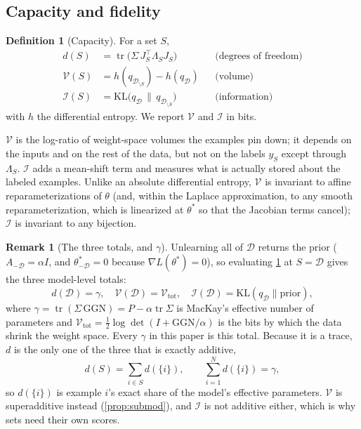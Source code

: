 \documentclass[10pt,twocolumn,letterpaper]{article}
\theoremstyle{definition}
\newtheorem{definition}{Definition}
\newtheorem{remark}{Remark}   %
\newcommand{\KL}{\mathrm{KL}}
\newcommand{\tr}{\operatorname{tr}}
\newcommand{\logdet}{\log\det}
\newcommand{\Vol}{\mathcal{V}}
\newcommand{\Inf}{\mathcal{I}}
\newcommand{\D}{\mathcal{D}}
\newcommand{\DS}{\mathcal{D}_{\setminus S}}
\newcommand{\T}{^{\top}}
\newcommand{\dof}{d}
\begin{document}
\subsection{Capacity and fidelity}
\begin{definition}[Capacity]\label{def:capacity}
For a set $S$,
\begin{align*}
\dof(S)&=\tr\!\big(\Sigma\,J_S\T\Lambda_SJ_S\big) &&\text{(degrees of freedom)}\\
\Vol(S)&=h(q_{\DS})-h(q_\D) &&\text{(volume)}\\
\Inf(S)&=\KL\big(q_\D\,\|\,q_{\DS}\big) &&\text{(information)}
\end{align*}
with $h$ the differential entropy. We report $\Vol$ and $\Inf$ in bits.
\end{definition}
$\Vol$ is the log-ratio of weight-space volumes the examples pin down; it depends on the inputs and on the rest of the data, but not on the labels $y_S$ except through $\Lambda_S$. $\Inf$ adds a mean-shift term and measures what is actually stored about the labeled examples. Unlike an absolute differential entropy, $\Vol$ is invariant to affine reparameterizations of $\theta$ (and, within the Laplace approximation, to any smooth reparameterization, which is linearized at $\theta^*$ so that the Jacobian terms cancel); $\Inf$ is invariant to any bijection.

\begin{remark}[The three totals, and $\gamma$]\label{rem:totals}
Unlearning all of $\D$ returns the prior ($A_{-\D}=\alpha I$, and $\theta^*_{-\D}=0$ because $\nabla L(\theta^*)=0$), so evaluating \cref{def:capacity} at $S=\D$ gives the three model-level totals:
\begin{equation}
\dof(\D)=\gamma,\quad \Vol(\D)=\Vol_{\mathrm{tot}},\quad \Inf(\D)=\KL(q_\D\|\mathrm{prior}),
\label{eq:totals}
\end{equation}
where $\gamma=\tr(\Sigma\,\mathrm{GGN})=P-\alpha\tr\Sigma$ is MacKay's effective number of parameters \citep{mackay1992} and $\Vol_{\mathrm{tot}}=\tfrac12\logdet(I+\mathrm{GGN}/\alpha)$ is the bits by which the data shrink the weight space. Every $\gamma$ in this paper is this total. Because it is a trace, $\dof$ is the only one of the three that is exactly additive,
\begin{equation}
\dof(S)=\textstyle\sum_{i\in S}\dof(\{i\}),\qquad \textstyle\sum_{i=1}^N\dof(\{i\})=\gamma,
\label{eq:dof-additive}
\end{equation}
so $\dof(\{i\})$ is example $i$'s exact share of the model's effective parameters. $\Vol$ is superadditive instead (\cref{prop:submod}), and $\Inf$ is not additive either, which is why sets need their own scores.
\end{remark}
\end{document}
